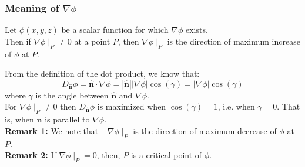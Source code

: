 \documentclass[a4paper, 10pt]{article}
\begin{document}
\subsubsection{Meaning of $\nabla \phi$}
\begin{theorembox}
  Let $\phi(x,y,z)$ be a scalar function for which $\nabla \phi$ exists. \\
  Then if $\nabla \phi \mid_P \neq 0$ at a point $P$, then $\nabla \phi \mid_P$ is the direction of maximum increase of $\phi$ at $P$.
\end{theorembox}
\begin{proofbox}
  From the definition of the dot product, we know that:
  $$D_{\hat{\mathbf{n}}} \phi = \hat{\mathbf{n}} \cdot \nabla \phi = |\hat{\mathbf{n}}| |\nabla \phi| \cos(\gamma) = |\nabla \phi| \cos(\gamma)$$
  \indent where $\gamma$ is the angle between $\hat{\mathbf{n}}$ and $\nabla \phi$. \\
  For $\nabla \phi \mid_P \neq 0$ then $D_{\hat{\mathbf{n}}} \phi$ is maximized when $\cos(\gamma) = 1$, i.e. when $\gamma = 0$. That is, when $\hat{\mathbf{n}}$ is parallel to $\nabla \phi$. \\[2ex]

  \textbf{Remark 1:} We note that $-\nabla \phi \mid_P$ is the direction of maximum decrease of $\phi$ at $P$. \\
  \textbf{Remark 2:} If $\nabla \phi \mid_P = 0$, then, $P$ is a critical point of $\phi$.
\end{proofbox}
\end{document}

